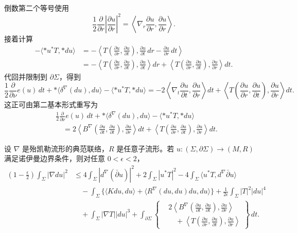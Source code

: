 倒数第二个等号使用
\[
 \frac12\frac\partial{\partial r}\left|\frac{\partial u}{\partial r}\right|^2
 =\left\langle\nabla_r\frac{\partial u}{\partial r},
 \frac{\partial u}{\partial r}\right\rangle.
\]
接着计算
\begin{align*}
 -\langle*u^*T,*du\rangle
 &=-\left\langle T\left(\frac{\partial u}{\partial r},
 \frac{\partial u}{\partial t}\right),
 \frac{\partial u}{\partial t}\,dr-
 \frac{\partial u}{\partial r}\,dt\right\rangle\\
 &=-\left\langle T\left(\frac{\partial u}{\partial r},
 \frac{\partial u}{\partial t}\right),\frac{\partial u}{\partial t}\right\rangle dr
 +\left\langle T\left(\frac{\partial u}{\partial r},
 \frac{\partial u}{\partial t}\right),\frac{\partial u}{\partial r}\right\rangle dt.
\end{align*}
代回并限制到 $\partial\Sigma$，得到
\[
 \frac12\frac\partial{\partial\nu}e(u)\,dt
 +*\langle\delta^\nabla(du),du\rangle-\langle*u^*T,*du\rangle
 =-2\left\langle\nabla_t\frac{\partial u}{\partial t},
 \frac{\partial u}{\partial r}\right\rangle dt
 +\left\langle T\left(\frac{\partial u}{\partial r},
 \frac{\partial u}{\partial t}\right),\frac{\partial u}{\partial r}\right\rangle dt.
\]
这正可由第二基本形式重写为
\[
 \begin{aligned}
 &\frac12\frac\partial{\partial\nu}e(u)\,dt
 +*\langle\delta^\nabla(du),du\rangle-\langle*u^*T,*du\rangle\\
 &\quad=2\left\langle B^\nabla\left(\frac{\partial u}{\partial t},
 \frac{\partial u}{\partial t}\right),\frac{\partial u}{\partial r}\right\rangle dt
 +\left\langle T\left(\frac{\partial u}{\partial r},
 \frac{\partial u}{\partial t}\right),\frac{\partial u}{\partial r}\right\rangle dt.
 \end{aligned}
\]

\begin{theorem}\label{thm:ch8-off-shell-integral-identity}
设 $\nabla$ 是殆凯勒流形的典范联络，$R$ 是任意子流形。若
$u:(\Sigma,\partial\Sigma)\to(M,R)$ 满足诺伊曼边界条件，则对任意
$0<\epsilon<2$，
\begin{equation}
\begin{split}
\left(1-\frac\epsilon2\right)\int_\Sigma|\nabla du|^2
&\leq4\int_\Sigma|d^\nabla(\bar\partial u)|^2+2\int_\Sigma|u^*T|^2
-4\int_\Sigma\langle u^*T,d^\nabla\bar\partial u\rangle\\
&\quad-\int_\Sigma\{\langle Kdu,du\rangle+\langle R^\nabla(du,du)du,du\rangle\}
+\frac1{2\epsilon}\int_\Sigma|T|^2|du|^4\\
&\quad+\int_\Sigma|\nabla T||du|^3
+\int_{\partial\Sigma}\left\{
\begin{aligned}
&2\left\langle B^\nabla\left(\frac{\partial u}{\partial t},
\frac{\partial u}{\partial t}\right),\frac{\partial u}{\partial r}\right\rangle\\
&\quad+\left\langle T\left(\frac{\partial u}{\partial r},
\frac{\partial u}{\partial t}\right),\frac{\partial u}{\partial r}\right\rangle
\end{aligned}\right\}\,dt.
\end{split}
\label{eq:ch8-off-shell-integral-estimate}
\end{equation}
\end{theorem}


